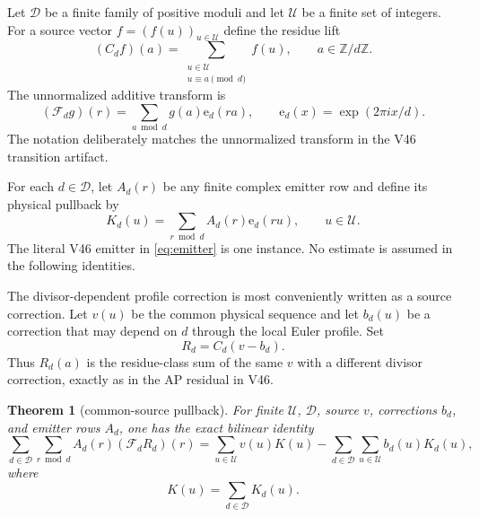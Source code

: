 \documentclass[11pt]{article}
\newtheorem{theorem}{Theorem}[section]
\theoremstyle{definition}
\theoremstyle{remark}
\newcommand{\ZZ}{\mathbb Z}
\newcommand{\Dd}{\mathcal D}
\newcommand{\UU}{\mathcal U}
\newcommand{\ee}{\mathrm e}
\newcommand{\F}{\mathcal F}
\begin{document}
Let $\Dd$ be a finite family of positive moduli and let $\UU$ be a finite set
of integers.  For a source vector $f=(f(u))_{u\in\UU}$ define the residue lift
\begin{equation}
 (C_df)(a)=\sum_{\substack{u\in\UU\\u\equiv a\pmod d}} f(u),
 \qquad a\in\ZZ/d\ZZ.
 \label{eq:lift}
\end{equation}
The unnormalized additive transform is
\begin{equation}
 (\F_d g)(r)=\sum_{a\bmod d}g(a)\ee_d(ra),
 \qquad \ee_d(x)=\exp(2\pi i x/d).
 \label{eq:dft}
\end{equation}
The notation deliberately matches the unnormalized transform in the V46
transition artifact.

For each $d\in\Dd$, let $A_d(r)$ be any finite complex emitter row and define
its physical pullback by
\begin{equation}
 K_d(u)=\sum_{r\bmod d} A_d(r)\ee_d(ru),
 \qquad u\in\UU.
 \label{eq:pullback-kernel}
\end{equation}
The literal V46 emitter in \eqref{eq:emitter} is one instance.  No estimate is
assumed in the following identities.

The divisor-dependent profile correction is most conveniently written as a
source correction.  Let $v(u)$ be the common physical sequence and let
$b_d(u)$ be a correction that may depend on $d$ through the local Euler
profile.  Set
\begin{equation}
 R_d=C_d(v-b_d).
 \label{eq:residual-vector}
\end{equation}
Thus $R_d(a)$ is the residue-class sum of the same $v$ with a different
divisor correction, exactly as in the AP residual in V46.

\begin{theorem}[common-source pullback]
\label{thm:pullback}
For finite $\UU$, $\Dd$, source $v$, corrections $b_d$, and emitter rows
$A_d$, one has the exact bilinear identity
\begin{equation}
 \sum_{d\in\Dd}\sum_{r\bmod d} A_d(r)(\F_dR_d)(r)
 =\sum_{u\in\UU}v(u)K(u)
 -\sum_{d\in\Dd}\sum_{u\in\UU}b_d(u)K_d(u),
 \label{eq:pullback-identity}
\end{equation}
where
\begin{equation}
 K(u)=\sum_{d\in\Dd}K_d(u).
 \label{eq:joint-kernel}
\end{equation}
\end{theorem}
\end{document}
